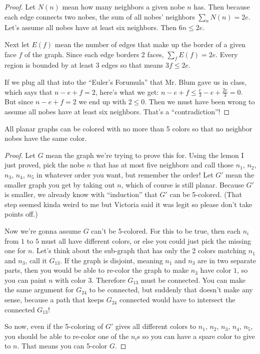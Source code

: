 \documentclass{article}
\begin{document}
\begin{proof}
	Let $N(n)$ mean how many neighbors a given nobe $n$ has. Then because each edge connects two nobes, the sum of all nobes' neighbors $\sum_n N(n) = 2e$. Let's assume all nobes have at least six neighbors. Then $6n \le 2e$.

	Next let $E(f)$ mean the number of edges that make up the border of a given face $f$ of the graph. Since each edge borders 2 faces, $\sum_f E(f) = 2e$. Every region is bounded by at least 3 edges so that means $3f \le 2e$.

	If we plug all that into the ``Euler's Forumula'' that Mr. Blum gave us in class, which says that $n-e+f=2$, here's what we get: $n-e+f \le \frac{e}{3} - e + \frac{2e}{3} = 0$. But since $n-e+f = 2$ we end up with $2\le0$. Then we must have been wrong to assume all nobes have at least six neighbors. That's a ``contradiction''!
\end{proof}

\begin{theorem}
All planar graphs can be colored with no more than 5 colors so that no neighbor nobes have the same color.
\label{thm:5c}
\end{theorem}

\begin{proof}
	Let $G$ mean the graph we're trying to prove this for. Using the lemon I just proved, pick the nobe $n$ that has at most five neighbors and call those $n_1$, $n_2$, $n_3$, $n_4$, $n_5$ in whatever order you want, but remember the order! Let $G'$ mean the smaller graph you get by taking out $n$, which of course is still planar. Because $G'$ is smaller, we already know with ``induction'' that $G'$ can be 5-colored. (That step seemed kinda weird to me but Victoria said it was legit so please don't take points off.)

	Now we're gonna assume $G$ can't be 5-colored. For this to be true, then each $n_i$ from $1$ to $5$ must all have different colors, or else you could just pick the missing one for $n$. Let's think about the sub-graph that has only the 2 colors matching $n_1$ and $n_3$, call it $G_{13}$. If the graph is disjoint, meaning $n_1$ and $n_3$ are in two separate parts, then you would be able to re-color the graph to make $n_3$ have color $1$, so you can paint $n$ with color $3$. Therefore $G_{13}$ must be connected. You can make the same argument for $G_{24}$ to be connected, but suddenly that doesn't make any sense, because a path that keeps $G_{24}$ connected would have to intersect the connected $G_{13}$!

	So now, even if the 5-coloring of $G'$ gives all different colors to $n_1$, $n_2$, $n_3$, $n_4$, $n_5$, you should be able to re-color one of the $n_i$s so you can have a spare color to give to $n$. That means you can 5-color $G$.
\end{proof}
\end{document}
